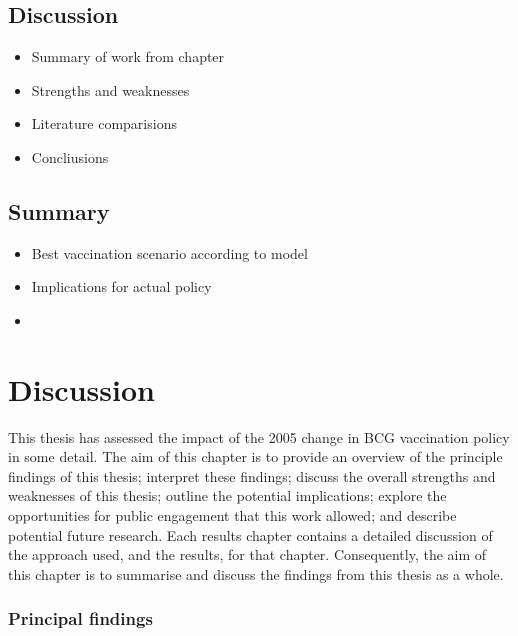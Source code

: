 \documentclass[11pt,twoside]{bristolthesis}
\providecommand{\tightlist}{%
  \setlength{\itemsep}{0pt}\setlength{\parskip}{0pt}}
\begin{document}
  \hypertarget{discussion-5}{%
  \section{Discussion}\label{discussion-5}}
  \begin{itemize}
  \tightlist
  \item
    Summary of work from chapter
  \item
    Strengths and weaknesses
  \item
    Literature comparisions
  \item
    Concliusions
  \end{itemize}
  \hypertarget{summary-9}{%
  \section{Summary}\label{summary-9}}
  \begin{itemize}
  \item
    Best vaccination scenario according to model
  \item
    Implications for actual policy
  \item
  \end{itemize}
  \hypertarget{discussion}{%
  \chapter{Discussion}\label{discussion}}
  
  This thesis has assessed the impact of the 2005 change in BCG vaccination policy in some detail. The aim of this chapter is to provide an overview of the principle findings of this thesis; interpret these findings; discuss the overall strengths and weaknesses of this thesis; outline the potential implications; explore the opportunities for public engagement that this work allowed; and describe potential future research. Each results chapter contains a detailed discussion of the approach used, and the results, for that chapter. Consequently, the aim of this chapter is to summarise and discuss the findings from this thesis as a whole.
  
  \hypertarget{principal-findings}{%
  \subsection{Principal findings}\label{principal-findings}}
  
\end{document}
